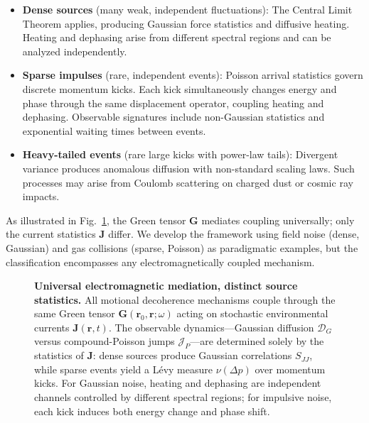 \begin{itemize}[leftmargin=*,nosep]
\item \textbf{Dense sources} (many weak, independent fluctuations): The Central Limit Theorem applies, producing Gaussian force statistics and diffusive heating. Heating and dephasing arise from different spectral regions and can be analyzed independently.

\item \textbf{Sparse impulses} (rare, independent events): Poisson arrival statistics govern discrete momentum kicks. Each kick simultaneously changes energy and phase through the same displacement operator, coupling heating and dephasing. Observable signatures include non-Gaussian statistics and exponential waiting times between events.

\item \textbf{Heavy-tailed events} (rare large kicks with power-law tails): Divergent variance produces anomalous diffusion with non-standard scaling laws. Such processes may arise from Coulomb scattering on charged dust or cosmic ray impacts.
\end{itemize}

As illustrated in Fig.~\ref{fig:em_mediation}, the Green tensor $\mathbf{G}$ mediates coupling universally; only the current statistics $\mathbf{J}$ differ. We develop the framework using field noise (dense, Gaussian) and gas collisions (sparse, Poisson) as paradigmatic examples, but the classification encompasses any electromagnetically coupled mechanism.

\begin{figure}[t]
  \centering
  
  \caption{\textbf{Universal electromagnetic mediation, distinct source statistics.}
  All motional decoherence mechanisms couple through the same Green tensor $\mathbf{G}(\mathbf{r}_0,\mathbf{r};\omega)$ acting on stochastic environmental currents $\mathbf{J}(\mathbf{r},t)$. 
  The observable dynamics—Gaussian diffusion $\mathcal{D}_G$ versus compound-Poisson jumps $\mathcal{J}_P$—are determined solely by the statistics of $\mathbf{J}$: dense sources produce Gaussian correlations $S_{JJ}$, while sparse events yield a L\'evy measure $\nu(\Delta p)$ over momentum kicks. For Gaussian noise, heating and dephasing are independent channels controlled by different spectral regions; for impulsive noise, each kick induces both energy change and phase shift.}
  \label{fig:em_mediation}
\end{figure}


